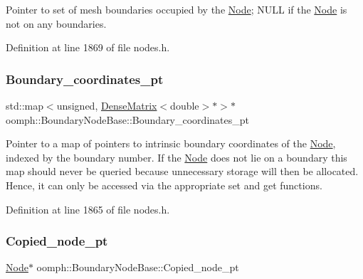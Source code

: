 Pointer to set of mesh boundaries occupied by the \hyperlink{classoomph_1_1Node}{Node}; N\+U\+LL if the \hyperlink{classoomph_1_1Node}{Node} is not on any boundaries. 



Definition at line 1869 of file nodes.\+h.

\mbox{\label{classoomph_1_1BoundaryNodeBase_a732b1ffccbcd7b79097a1779a94e9497}} 
\subsubsection{\texorpdfstring{Boundary\+\_\+coordinates\+\_\+pt}{Boundary\_coordinates\_pt}}
{\footnotesize\ttfamily std\+::map$<$unsigned, \hyperlink{classoomph_1_1DenseMatrix}{Dense\+Matrix}$<$double$>$$\ast$$>$$\ast$ oomph\+::\+Boundary\+Node\+Base\+::\+Boundary\+\_\+coordinates\+\_\+pt\hspace{0.3cm}{\ttfamily [private]}}



Pointer to a map of pointers to intrinsic boundary coordinates of the \hyperlink{classoomph_1_1Node}{Node}, indexed by the boundary number. If the \hyperlink{classoomph_1_1Node}{Node} does not lie on a boundary this map should never be queried because unnecessary storage will then be allocated. Hence, it can only be accessed via the appropriate set and get functions. 



Definition at line 1865 of file nodes.\+h.

\mbox{\label{classoomph_1_1BoundaryNodeBase_a4afcc250ee4d601a60f06d0d39ebaca0}} 
\subsubsection{\texorpdfstring{Copied\+\_\+node\+\_\+pt}{Copied\_node\_pt}}
{\footnotesize\ttfamily \hyperlink{classoomph_1_1Node}{Node}$\ast$ oomph\+::\+Boundary\+Node\+Base\+::\+Copied\+\_\+node\+\_\+pt\hspace{0.3cm}{\ttfamily [protected]}}



